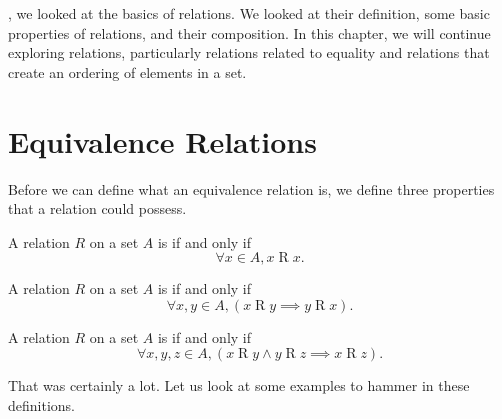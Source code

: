, we looked at the basics of relations. We looked at their definition, some basic properties of relations, and their composition. In this chapter, we will continue exploring relations, particularly relations related to equality and relations that create an ordering of elements in a set.

\section{Equivalence Relations}
Before we can define what an equivalence relation is, we define three properties that a relation could possess.

\begin{definition}[Reflexivity]
    A relation $R$ on a set $A$ is  if and only if
        \[
            \forall x \in A, x\mathrel{R}x.
        \]
\end{definition}

\begin{definition}[Symmetry]
    A relation $R$ on a set $A$ is  if and only if
    \[
        \forall x,y \in A, (x\mathrel{R}y \implies y\mathrel{R}x).
    \]
\end{definition}

\begin{definition}[Transitivity]
    A relation $R$ on a set $A$ is  if and only if
    \[
        \forall x,y,z \in A, (x\mathrel{R}y \land y\mathrel{R}z \implies x\mathrel{R}z).
    \]
\end{definition}

That was certainly a lot. Let us look at some examples to hammer in these definitions.

